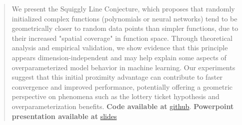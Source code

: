 \documentclass{article}
\theoremstyle{plain}
\theoremstyle{definition}
\theoremstyle{remark}
\begin{document}


\begin{abstract}
We present the Squiggly Line Conjecture, which proposes that randomly initialized complex functions (polynomials or neural networks) tend to be geometrically closer to random data points than simpler functions, due to their increased "spatial coverage" in function space. Through theoretical analysis and empirical validation, we show evidence that this principle appears dimension-independent and may help explain some aspects of overparameterized model behavior in machine learning. Our experiments suggest that this initial proximity advantage can contribute to faster convergence and improved performance, potentially offering a geometric perspective on phenomena such as the lottery ticket hypothesis and overparameterization benefits. \textbf{Code available at} \href{https://github.com/Ghost---Shadow/squiggly-line-conjecture/}{github}. \textbf{Powerpoint presentation available at} \href{https://docs.google.com/presentation/d/1hucbKOalHq7g2sTdvyAnd1pDTRlAkg48H2wFui5UQTg/edit?usp=sharing}{slides}
\end{abstract}

















\newpage
\appendix
\onecolumn









\end{document}
